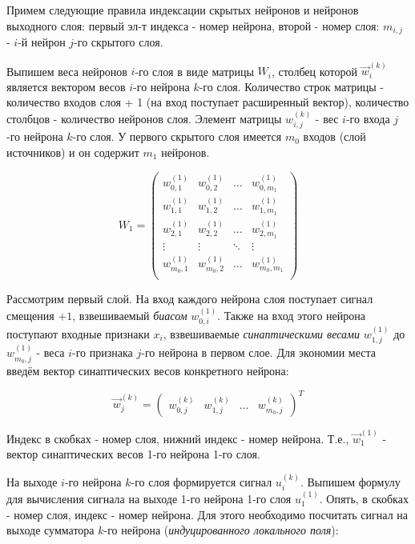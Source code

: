 \documentclass{article}
\begin{document}
Примем следующие правила индексации скрытых нейронов и нейронов выходного слоя:
первый эл-т индекса - номер нейрона, второй - номер слоя: $m_{i,j}$  - $i$-й нейрон $j$-го скрытого слоя.

Выпишем веса нейронов $i$-го слоя в виде матрицы $W_i$, столбец которой $\vec{w}_i^{(k)}$ является вектором весов $i$-го нейрона $k$-го слоя.
Количество строк матрицы - количество входов слоя + 1 (на вход поступает расширенный вектор), количество столбцов - количество нейронов слоя.
Элемент матрицы $w_{i,j}^{(k)}$ - вес $i$-го входа $j$-го нейрона $k$-го слоя.
У первого скрытого слоя имеется $m_0$ входов (слой источников) и он содержит $m_1$ нейронов.

\begin{equation}
    W_1 = 
    \begin{pmatrix}
        w_{0,1}^{(1)} & w_{0,2}^{(1)} & \dots & w_{0,{m_1}}^{(1)} \\
        w_{1,1}^{(1)} & w_{1,2}^{(1)} & \dots & w_{1,{m_1}}^{(1)} \\
        w_{2,1}^{(1)} & w_{2,2}^{(1)} & \dots & w_{2,{m_1}}^{(1)} \\
        \vdots        & \vdots        & \ddots & \vdots           \\
        w_{{m_0},1}^{(1)} & w_{{m_0},2}^{(1)} & \dots & w_{{m_0},{m_1}}^{(1)} \\
    \end{pmatrix}
\end{equation}

Рассмотрим первый слой.
На вход каждого нейрона слоя поступает сигнал смещения $+1$, взвешиваемый \textit{биасом} $w_{0,i}^{(1)}$. 
Также на вход этого нейрона поступают входные признаки $x_i$, взвешиваемые \textit{синаптическими весами} $w_{1,j}^{(1)}$ до $w_{{m_0},j}^{(1)}$ - веса $i$-го признака $j$-го нейрона в первом слое.   
Для экономии места введём вектор синаптических весов конкретного нейрона:

\begin{equation}
    \vec{w}_j^{(k)} = 
    \begin{pmatrix}
        w_{0,j}^{(k)} & w_{1,j}^{(k)} & \dots & w_{{m_0},j}^{(k)}
    \end{pmatrix}
    ^T
\end{equation}


Индекс в скобках - номер слоя, нижний индекс - номер нейрона. Т.е., $\vec{w}_1^{(1)}$ - вектор синаптических весов 1-го нейрона 1-го слоя.

На выходе $i$-го нейрона $k$-го слоя формируется сигнал $u_i^{(k)}$. 
Выпишем формулу для вычисления сигнала на выходе 1-го нейрона 1-го слоя $u_1^{(1)}$. Опять, в скобках - номер слоя, индекс - номер нейрона.
Для этого необходимо посчитать сигнал на выходе сумматора $k$-го нейрона (\textit{индуцированного локального поля}):
\end{document}

